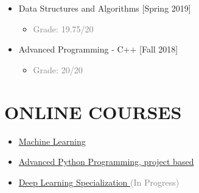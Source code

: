 \documentclass[10pt,a4paper,sans]{moderncv} %
\begin{document}
\begin{multicols}{2}
\begin{itemize}
			\item {} Data Structures and Algorithms \hfill[Spring 2019]
			\begin{itemize}
			    \item \textcolor{gray}{Grade: 19.75/20}
			\end{itemize}
			\vspace{0.5em}
			
			\item {} Advanced Programming - C++ \hfill[Fall 2018]
			\begin{itemize}
			    \item \textcolor{gray}{Grade: 20/20}
			\end{itemize}
		\end{itemize}
	\end{multicols}
		
    \section{ ONLINE COURSES}
	\begin{multicols}{2}
		\begin{itemize}
			\item {}  \href{https://www.coursera.org/learn/machine-learning}{Machine Learning}
			\vspace{0.5em}
			\item {} \href{https://quera.ir/college/land/3078/}{Advanced Python Programming, project based}
			\vspace{0.5em}	
			\item {} \href{https://www.coursera.org/specializations/deep-learning?/}{Deep Learning Specialization  }\textcolor{gray}{ (In Progress)}

		\end{itemize}
	\end{multicols}
\end{document}
